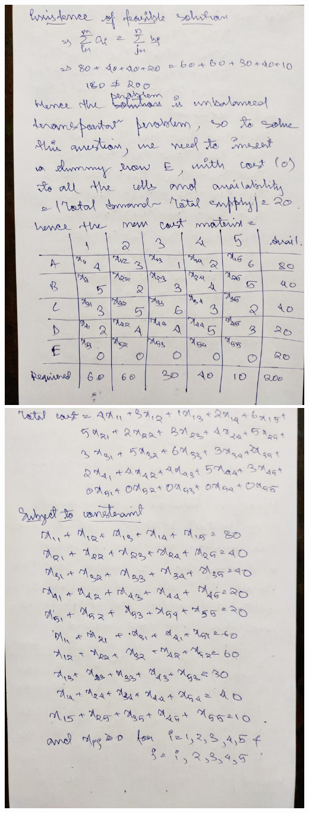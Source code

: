 \documentclass[12pt, letterpaper, twoside]{book}
\begin{document}
\includegraphics[width=\paperwidth, height=\paperheight]{Page9}
\includegraphics[width=\paperwidth, height=\paperheight]{Page10}
\end{document}
